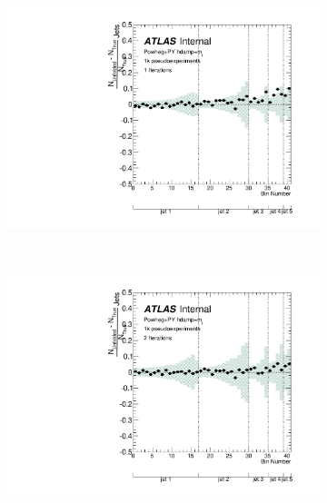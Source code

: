 \begin{figure}
\begin{subfigure}[]{0.5\textwidth}
\includegraphics[width=\textwidth]{fig/Stress/110404atlfast/FracBias1Iterations.pdf}
\end{subfigure}
~
\begin{subfigure}[]{0.5\textwidth}
\includegraphics[width=\textwidth]{fig/Stress/110404atlfast/FracBias2Iterations.pdf}
\end{subfigure}
\\
\begin{subfigure}[]{0.5\textwidth}

\end{subfigure}
\end{figure}
